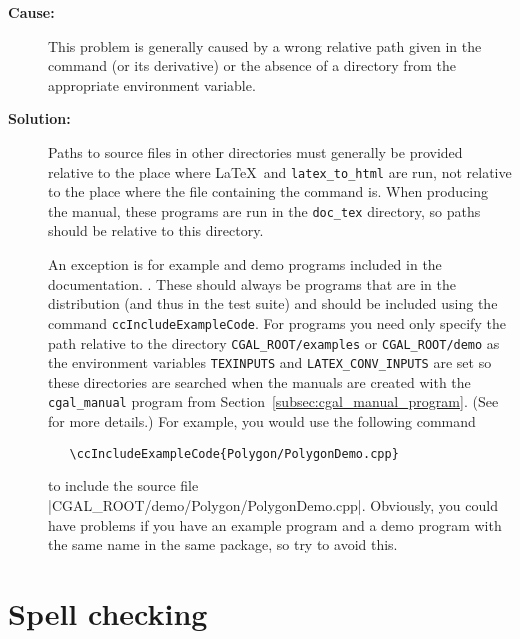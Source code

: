 \begin{description}
\item[{\bf Cause:}] This problem is generally caused by a wrong relative path
given in the \verb|| command (or its derivative) or the absence of a
directory from the appropriate environment variable.

\item[{\bf Solution:}] Paths to source files in other directories must
generally be provided relative to the place where \LaTeX\ and
\texttt{latex\_to\_html} are run, not relative to the place where
the file containing the command is.  When producing the manual,
these programs are run in the \texttt{doc\_tex} directory, so paths
should be relative to this directory.

An exception is for example and demo programs included in the documentation.
.  These should always
be programs that are in the distribution (and thus in the test suite)
and should be included using the command \texttt{ccIncludeExampleCode}.  For
programs you need only specify the path relative to the directory
\texttt{CGAL\_ROOT/examples} or \texttt{CGAL\_ROOT/demo} as the environment
variables \texttt{TEXINPUTS} and \texttt{LATEX\_CONV\_INPUTS} are set so these
directories are searched when the manuals are created with the
\texttt{cgal\_manual} program from Section~\ref{subsec:cgal_manual_program}.
(See
for more details.)
For example, you would use the following command
\begin{verbatim}
   \ccIncludeExampleCode{Polygon/PolygonDemo.cpp}
\end{verbatim}
to include the source file \nonlinkedpath|CGAL_ROOT/demo/Polygon/PolygonDemo.cpp|.
Obviously, you could have problems if you have an example program and a demo
program with the same name in the same package, so try to avoid this.
\end{description}


\section{Spell checking\label{sec:spell_checker}}

